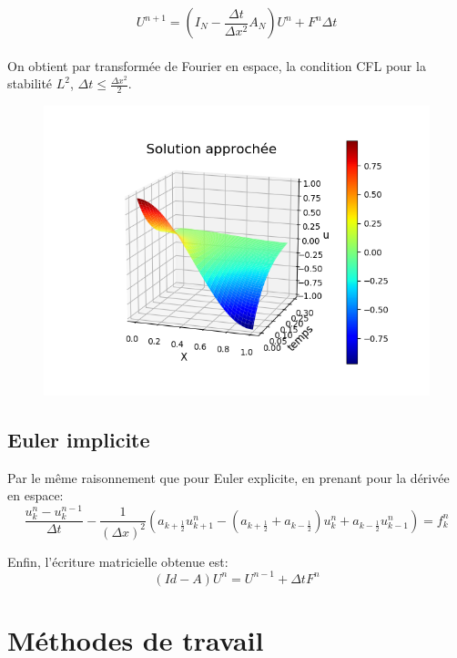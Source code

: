 \documentclass[a4paper,12pt,twoside]{report}
\begin{document}
$$U^{n+1} = (I_N - \frac{\Delta t}{ \Delta x^2} A_N)U^n  + F^n \Delta t $$ \\

On obtient par transformée de Fourier en espace, la condition CFL pour la stabilité $L^2$, $\Delta t \leq \frac{\Delta x^2}{2}$.\\

\begin{figure}
	\centering
	\includegraphics[scale=0.5]{./figure_1.png}\\
\end{figure}

\subsection{Euler implicite}
Par le même raisonnement que pour Euler explicite, en prenant pour la dérivée en espace:\\

$$ \frac{u_{k} ^{n} - u_{k} ^{n-1}}{ \Delta t} - \frac{1}{( \Delta x)^2} (a_{k+\frac{1}{2}} u_{k+1}^n -(a_{k+\frac{1}{2}} +a_{k-\frac{1}{2}}) u_k ^n + a_{k-\frac{1}{2}}u_{k-1} ^n ) = f_k ^n $$


Enfin, l'écriture matricielle obtenue est:\\

$$ (Id - A)U^n = U^{n-1} + \Delta t F^n $$



\smallbreak

\section{Méthodes de travail}
\end{document}
